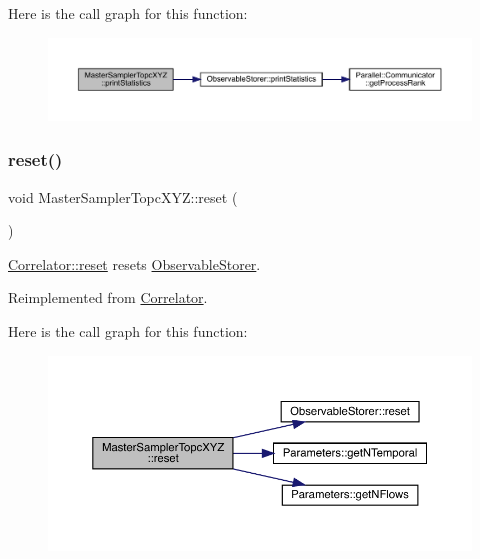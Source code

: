 Here is the call graph for this function\+:\nopagebreak
\begin{figure}[H]
\begin{center}
\leavevmode
\includegraphics[width=350pt]{class_master_sampler_topc_x_y_z_a5a34a7f90ce8eea6c0efa06cfdfeb5f1_cgraph}
\end{center}
\end{figure}
\mbox{\label{class_master_sampler_topc_x_y_z_aef8d0b1b431711c6410cfece1c007b4a}} 
\subsubsection{\texorpdfstring{reset()}{reset()}}
{\footnotesize\ttfamily void Master\+Sampler\+Topc\+X\+Y\+Z\+::reset (\begin{DoxyParamCaption}{ }\end{DoxyParamCaption})\hspace{0.3cm}{\ttfamily [virtual]}}



\mbox{\hyperlink{class_correlator_aacca40262d2cd62f0a3964e832f948c1}{Correlator\+::reset}} resets \mbox{\hyperlink{class_observable_storer}{Observable\+Storer}}. 



Reimplemented from \mbox{\hyperlink{class_correlator_aacca40262d2cd62f0a3964e832f948c1}{Correlator}}.

Here is the call graph for this function\+:\nopagebreak
\begin{figure}[H]
\begin{center}
\leavevmode
\includegraphics[width=350pt]{class_master_sampler_topc_x_y_z_aef8d0b1b431711c6410cfece1c007b4a_cgraph}
\end{center}
\end{figure}
\mbox{\label{class_master_sampler_topc_x_y_z_af748653ded9908f78383185475b9ddeb}} 
